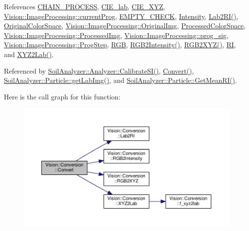 References \hyperlink{_image_processing_8h_source_l00014}{C\+H\+A\+I\+N\+\_\+\+P\+R\+O\+C\+E\+S\+S}, \hyperlink{_conversion_8h_source_l00017}{C\+I\+E\+\_\+lab}, \hyperlink{_conversion_8h_source_l00018}{C\+I\+E\+\_\+\+X\+Y\+Z}, \hyperlink{_image_processing_8h_source_l00070}{Vision\+::\+Image\+Processing\+::current\+Prog}, \hyperlink{_image_processing_8h_source_l00022}{E\+M\+P\+T\+Y\+\_\+\+C\+H\+E\+C\+K}, \hyperlink{_conversion_8h_source_l00021}{Intensity}, \hyperlink{_conversion_8cpp_source_l00256}{Lab2\+R\+I()}, \hyperlink{_conversion_8h_source_l00024}{Original\+Color\+Space}, \hyperlink{_image_processing_8h_source_l00063}{Vision\+::\+Image\+Processing\+::\+Original\+Img}, \hyperlink{_conversion_8h_source_l00025}{Processed\+Color\+Space}, \hyperlink{_image_processing_8h_source_l00064}{Vision\+::\+Image\+Processing\+::\+Processed\+Img}, \hyperlink{_image_processing_8h_source_l00058}{Vision\+::\+Image\+Processing\+::prog\+\_\+sig}, \hyperlink{_image_processing_8h_source_l00071}{Vision\+::\+Image\+Processing\+::\+Prog\+Step}, \hyperlink{_conversion_8h_source_l00020}{R\+G\+B}, \hyperlink{_conversion_8cpp_source_l00190}{R\+G\+B2\+Intensity()}, \hyperlink{_conversion_8cpp_source_l00207}{R\+G\+B2\+X\+Y\+Z()}, \hyperlink{_conversion_8h_source_l00019}{R\+I}, and \hyperlink{_conversion_8cpp_source_l00225}{X\+Y\+Z2\+Lab()}.



Referenced by \hyperlink{analyzer_8cpp_source_l00388}{Soil\+Analyzer\+::\+Analyzer\+::\+Calibrate\+S\+I()}, \hyperlink{_conversion_8cpp_source_l00066}{Convert()}, \hyperlink{particle_8cpp_source_l00138}{Soil\+Analyzer\+::\+Particle\+::get\+Lab\+Img()}, and \hyperlink{particle_8cpp_source_l00120}{Soil\+Analyzer\+::\+Particle\+::\+Get\+Mean\+R\+I()}.



Here is the call graph for this function\+:
\nopagebreak
\begin{figure}[H]
\begin{center}
\leavevmode
\includegraphics[width=350pt]{class_vision_1_1_conversion_ac78b687a5b6cdf4c0ae812b5d76b13fc_cgraph}
\end{center}
\end{figure}




